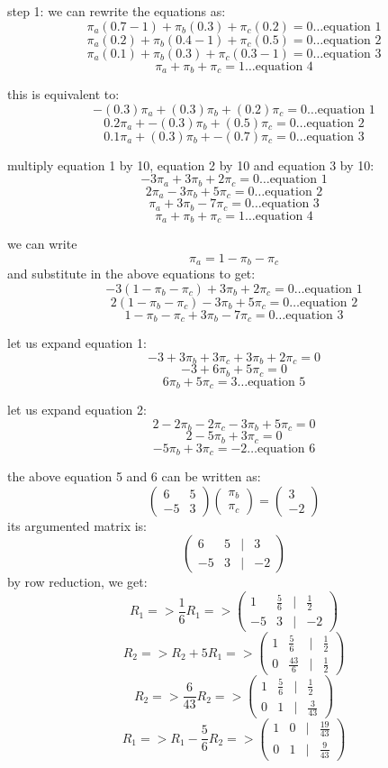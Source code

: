\documentclass{article}
\begin{document}
step 1: we can rewrite the equations as:
\[\pi_a(0.7 - 1) + \pi_b(0.3) + \pi_c(0.2) = 0 \ldots\text{equation 1}\]
\[\pi_a(0.2) + \pi_b(0.4 - 1) + \pi_c(0.5) = 0 \ldots\text{equation 2}\]
\[\pi_a(0.1) + \pi_b(0.3) + \pi_c(0.3 - 1) = 0 \ldots\text{equation 3}\]
\[\pi_a + \pi_b + \pi_c = 1 \ldots\text{equation 4}\]

this is equivalent to:
\[-(0.3)\pi_a + (0.3)\pi_b + (0.2)\pi_c = 0 \ldots\text{equation 1}\]
\[0.2\pi_a + -(0.3)\pi_b + (0.5)\pi_c = 0 \ldots\text{equation 2}\]
\[0.1\pi_a + (0.3)\pi_b + -(0.7)\pi_c = 0 \ldots\text{equation 3}\]

multiply equation 1 by 10, equation 2 by 10 and equation 3 by 10:
\[-3\pi_a + 3\pi_b + 2\pi_c = 0 \ldots\text{equation 1}\]
\[2\pi_a - 3\pi_b + 5\pi_c = 0 \ldots\text{equation 2}\]
\[\pi_a + 3\pi_b - 7\pi_c = 0 \ldots\text{equation 3}\]
\[\pi_a + \pi_b + \pi_c = 1 \ldots\text{equation 4}\]

we can write \[\pi_a = 1 - \pi_b - \pi_c\] and substitute in the above equations to get:
\[-3(1 - \pi_b - \pi_c) + 3\pi_b + 2\pi_c = 0 \ldots\text{equation 1}\]
\[2(1 - \pi_b - \pi_c) - 3\pi_b + 5\pi_c = 0 \ldots\text{equation 2}\]
\[1 - \pi_b - \pi_c + 3\pi_b - 7\pi_c = 0 \ldots\text{equation 3}\]

let us expand equation 1:
\[-3 + 3\pi_b + 3\pi_c + 3\pi_b + 2\pi_c = 0\]
\[-3 + 6\pi_b + 5\pi_c = 0\]
\[6\pi_b + 5\pi_c = 3 \ldots\text{equation 5}\]

let us expand equation 2:
\[2 - 2\pi_b - 2\pi_c - 3\pi_b + 5\pi_c = 0\]
\[2 - 5\pi_b + 3\pi_c = 0\]
\[-5\pi_b + 3\pi_c = -2 \ldots\text{equation 6}\]

the above equation 5 and 6 can be written as:
\[\begin{pmatrix}6&5\\-5&3\end{pmatrix}\begin{pmatrix}\pi_b\\\pi_c\end{pmatrix} = \begin{pmatrix}3\\-2\end{pmatrix}\]
its argumented matrix is:
\[\begin{pmatrix}6&5&|&3\\-5&3&|&-2\end{pmatrix}\]
by row reduction, we get:
\[R_1 => \frac{1}{6}R_1 => \begin{pmatrix}1&\frac{5}{6}&|&\frac{1}{2}\\-5&3&|&-2\end{pmatrix}\]
\[R_2 => R_2 + 5R_1 => \begin{pmatrix}1&\frac{5}{6}&|&\frac{1}{2}\\0&\frac{43}{6}&|&\frac{1}{2}\end{pmatrix}\]
\[R_2 => \frac{6}{43}R_2 => \begin{pmatrix}1&\frac{5}{6}&|&\frac{1}{2}\\0&1&|&\frac{3}{43}\end{pmatrix}\]
\[R_1 => R_1 - \frac{5}{6}R_2 => \begin{pmatrix}1&0&|&\frac{19}{43}\\0&1&|&\frac{9}{43}\end{pmatrix}\]
\end{document}

